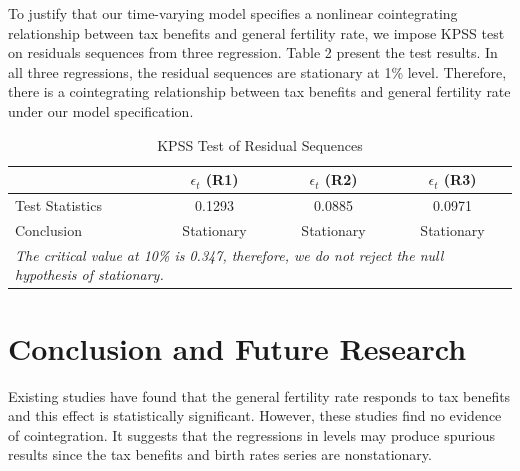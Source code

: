 \documentclass[12pt,a4paper]{article}
\begin{document}
To justify that our time-varying model specifies a nonlinear cointegrating relationship between tax benefits and general fertility rate, we impose KPSS test on residuals sequences from three regression. Table 2 present the test results. In all three regressions, the residual sequences are stationary at 1\% level. Therefore, there is a cointegrating relationship between tax benefits and general fertility rate under our model specification.

\begin{table}[!htp]
	\centering
	\caption{KPSS Test of Residual Sequences}
	\begin{tabular}{llll}
		\toprule
		& \multicolumn{1}{c}{$\epsilon_{t}$ (R1)} & \multicolumn{1}{c}{$\epsilon_{t}$ (R2)} & \multicolumn{1}{c}{$\epsilon_{t}$ (R3)} \\
		\midrule
		Test Statistics & \multicolumn{1}{c}{0.1293} & \multicolumn{1}{c}{0.0885} & \multicolumn{1}{c}{0.0971} \\
		Conclusion & \multicolumn{1}{c}{Stationary} & \multicolumn{1}{c}{Stationary} & \multicolumn{1}{c}{Stationary} \\
		\midrule
		\multicolumn{4}{l}{\textit{\footnotesize{The critical value at 10\% is 0.347, therefore, we do not reject the null hypothesis of stationary.}}} \\
	\end{tabular}%
	\label{tab:addlabel}%
\end{table}%

\section{Conclusion and Future Research}

Existing studies have found that the general fertility rate responds to tax benefits and this effect is statistically significant. However, these studies find no evidence of cointegration. It suggests that the regressions in levels may produce spurious results since the tax benefits and birth rates series are nonstationary. 
\end{document}
